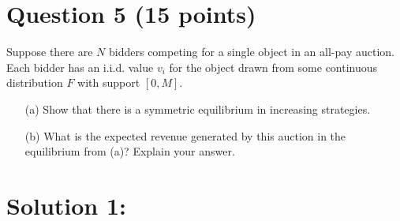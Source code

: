 \documentclass[10pt,a4paper]{article}
\begin{document}
\section*{Question 5 (15 points)}
Suppose there are $N$ bidders competing for a single object in an all-pay auction. Each bidder has an i.i.d. value $v_i$ for the object drawn from some continuous distribution $F$ with support $[0, M]$.
\begin{enumerate}
    \item[(a)] Show that there is a symmetric equilibrium in increasing strategies.
    \item[(b)] What is the expected revenue generated by this auction in the equilibrium from (a)? Explain your answer.
\end{enumerate}
\section*{Solution 1:}
\end{document}
